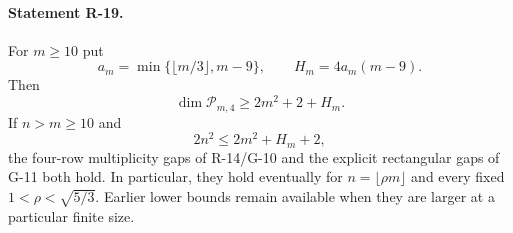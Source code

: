 \documentclass[11pt,a4paper]{article}
\theoremstyle{definition}\newtheorem{definition}{Definition}
\begin{document}
\paragraph{Statement R-19.}
For $m\geq10$ put
\[
 a_m=\min\{\lfloor m/3\rfloor,m-9\},\qquad
 H_m=4a_m(m-9).
\]
Then
\begin{equation}\label{R19:dimension}
 \dim\mathcal P_{m,4}\geq2m^2+2+H_m.
\end{equation}
If $n>m\geq10$ and
\begin{equation}\label{R19:padding}
 2n^2\leq2m^2+H_m+2,
\end{equation}
the four-row multiplicity gaps of R-14/G-10 and the explicit
rectangular gaps of G-11 both hold. In particular, they hold
eventually for $n=\lfloor\rho m\rfloor$ and every fixed
$1<\rho<\sqrt{5/3}$. Earlier lower bounds remain available
when they are larger at a particular finite size.
\end{document}
